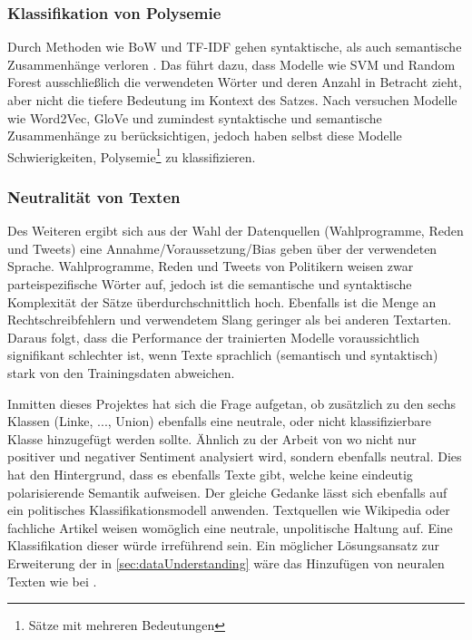 \subsubsection{Klassifikation von Polysemie}


Durch Methoden wie \ac{BoW} und \ac{TF-IDF} gehen syntaktische, als auch semantische Zusammenhänge verloren \autocite[48\psq]{kowsari_text_2019}. Das führt dazu, dass Modelle wie \ac{SVM} und Random Forest ausschließlich die verwendeten Wörter und deren Anzahl in Betracht zieht, aber nicht die tiefere Bedeutung im Kontext des Satzes. Nach \textcite{kowsari_text_2019} versuchen Modelle wie Word2Vec, GloVe und \ft zumindest syntaktische und semantische Zusammenhänge zu berücksichtigen, jedoch haben selbst diese Modelle Schwierigkeiten, Polysemie\footnote{Sätze mit mehreren Bedeutungen} zu klassifizieren.


\subsubsection{Neutralität von Texten} %


Des Weiteren ergibt sich aus der Wahl der Datenquellen (Wahlprogramme, Reden und Tweets) eine Annahme/Voraussetzung/Bias geben über der verwendeten Sprache. Wahlprogramme, Reden und Tweets von Politikern weisen zwar parteispezifische Wörter auf, jedoch ist die semantische und syntaktische Komplexität der Sätze überdurchschnittlich hoch. Ebenfalls ist die Menge an Rechtschreibfehlern und verwendetem Slang geringer als bei anderen Textarten. Daraus folgt, dass die Performance der trainierten Modelle voraussichtlich signifikant schlechter ist, wenn Texte sprachlich (semantisch und syntaktisch) stark von den Trainingsdaten abweichen.

Inmitten dieses Projektes hat sich die Frage aufgetan, ob zusätzlich zu den sechs Klassen (Linke, ..., Union) ebenfalls eine neutrale, oder nicht klassifizierbare Klasse hinzugefügt werden sollte. Ähnlich zu der Arbeit von \textcite{guhr_training_2020} wo nicht nur positiver und negativer Sentiment analysiert wird, sondern ebenfalls neutral. Dies hat den Hintergrund, dass es ebenfalls Texte gibt, welche keine eindeutig polarisierende Semantik aufweisen. Der gleiche Gedanke lässt sich ebenfalls auf ein politisches Klassifikationsmodell anwenden. Textquellen wie Wikipedia oder fachliche Artikel weisen womöglich eine neutrale, unpolitische Haltung auf. Eine Klassifikation dieser würde irreführend sein. Ein möglicher Lösungsansatz zur Erweiterung der in \autoref{sec:dataUnderstanding} wäre das Hinzufügen von neuralen Texten wie bei \textcite{guhr_training_2020}.

